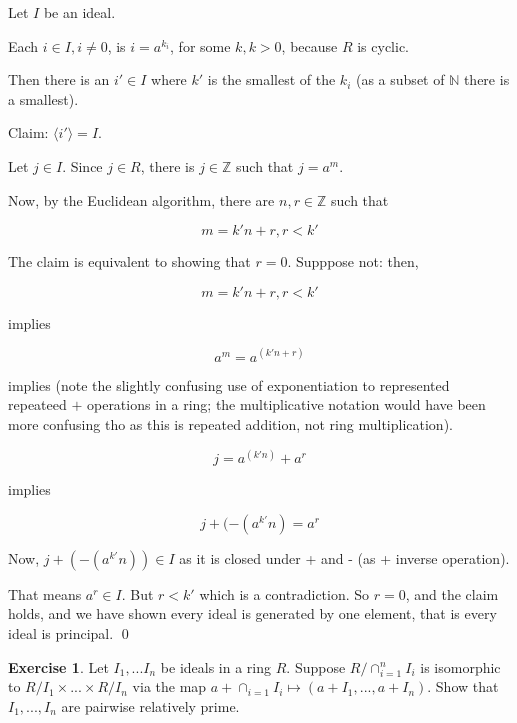 \documentclass[11pt,oneside]{article}
\numberwithin{equation}{section}
\theoremstyle{definition}
\newtheorem{exercise}{Exercise}
\def\ZZ{\mathbb{Z}}
\def\NN{\mathbb{N}}
\begin{document}
\begin{solution}
  Let $I$ be an ideal.

  Each $i \in I, i \neq 0$, is $i=a^{k_i}$, for some $k, k>0$, because $R$ is cyclic.

  Then there is an $i' \in I$ where $k'$ is the smallest of the $k_i$
  (as a subset of $\NN$ there is a smallest).

  Claim:  $ \langle i' \rangle = I$.

  Let $j \in I$.  Since $j \in R$, there is $j \in \ZZ$ such that $j = a^m$.

  Now, by the Euclidean algorithm, there are $n, r \in \ZZ$ such that

  $$
  m = k' n + r, r<k'
  $$

  The claim is equivalent to showing that $r=0$.  Supppose not: then,

  $$
  m = k' n + r, r<k'
  $$

  implies

  $$
  a^m = a^{(k'n + r)}
  $$

  implies (note the slightly confusing use of exponentiation to
  represented repeateed $+$ operations in a ring; the multiplicative
  notation would have been more confusing tho as this is repeated
  addition, not ring multiplication).  

  $$
  j = a^{(k'n)} + a^r
  $$

  implies

  $$
  j + (-(a^{k'}n) = a^r
  $$

  Now, $j + (-(a^{k'}n)) \in I$ as it is closed under + and - (as + inverse operation).

  That means $a^r \in I$.  But $ r < k'$ which is a contradiction.  So
  $r=0$, and the claim holds, and we have shown every ideal is generated by one element, that is
  every ideal is principal.
  \qed
  
  
\end{solution}
\begin{exercise}
  Let $I_1, ... I_n$ be ideals in a ring $R$.
  Suppose $R/\cap_{i=1}^n I_i$ is isomorphic to $R/I_1 \times ... \times R/I_n$ via the map
  $a+\cap_{i=1}I_i \mapsto (a + I_1, ... , a+ I_n)$.  Show that $I_1,
  ... , I_n$ are pairwise relatively prime.
\end{exercise}
\end{document}
